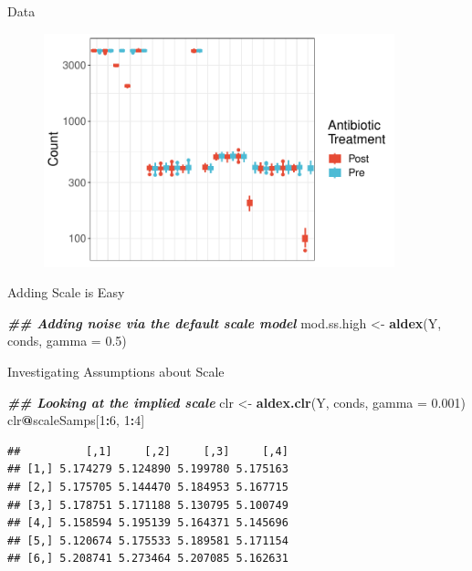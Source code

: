 \documentclass[
  ignorenonframetext,
]{beamer}
\newenvironment{Shaded}{\begin{snugshade}}{\end{snugshade}}
\newcommand{\AttributeTok}[1]{\textcolor[rgb]{0.13,0.29,0.53}{#1}}
\newcommand{\DecValTok}[1]{\textcolor[rgb]{0.00,0.00,0.81}{#1}}
\newcommand{\DocumentationTok}[1]{\textcolor[rgb]{0.56,0.35,0.01}{\textbf{\textit{#1}}}}
\newcommand{\FloatTok}[1]{\textcolor[rgb]{0.00,0.00,0.81}{#1}}
\newcommand{\FunctionTok}[1]{\textcolor[rgb]{0.13,0.29,0.53}{\textbf{#1}}}
\newcommand{\NormalTok}[1]{#1}
\newcommand{\OtherTok}[1]{\textcolor[rgb]{0.56,0.35,0.01}{#1}}
\newcommand{\SpecialCharTok}[1]{\textcolor[rgb]{0.81,0.36,0.00}{\textbf{#1}}}
\begin{document}
\begin{frame}{Data}
\protect\hypertarget{data}{}
\begin{figure}
  \centering
  \includegraphics[width=4in]{figures/sim-data.pdf}
\end{figure}
\end{frame}

\begin{frame}[fragile]{Adding Scale is Easy}
\protect\hypertarget{adding-scale-is-easy}{}
\begin{Shaded}
\begin{Highlighting}[]
\DocumentationTok{\#\# Adding noise via the default scale model}
\NormalTok{mod.ss.high }\OtherTok{\textless{}{-}} \FunctionTok{aldex}\NormalTok{(Y, conds, }\AttributeTok{gamma =} \FloatTok{0.5}\NormalTok{)}
\end{Highlighting}
\end{Shaded}
\end{frame}

\begin{frame}[fragile]{Investigating Assumptions about Scale}
\protect\hypertarget{investigating-assumptions-about-scale}{}
\begin{Shaded}
\begin{Highlighting}[]
\DocumentationTok{\#\# Looking at the implied scale}
\NormalTok{clr }\OtherTok{\textless{}{-}} \FunctionTok{aldex.clr}\NormalTok{(Y, conds, }\AttributeTok{gamma =} \FloatTok{0.001}\NormalTok{)}
\NormalTok{clr}\SpecialCharTok{@}\NormalTok{scaleSamps[}\DecValTok{1}\SpecialCharTok{:}\DecValTok{6}\NormalTok{, }\DecValTok{1}\SpecialCharTok{:}\DecValTok{4}\NormalTok{]}
\end{Highlighting}
\end{Shaded}

\begin{verbatim}
##          [,1]     [,2]     [,3]     [,4]
## [1,] 5.174279 5.124890 5.199780 5.175163
## [2,] 5.175705 5.144470 5.184953 5.167715
## [3,] 5.178751 5.171188 5.130795 5.100749
## [4,] 5.158594 5.195139 5.164371 5.145696
## [5,] 5.120674 5.175533 5.189581 5.171154
## [6,] 5.208741 5.273464 5.207085 5.162631
\end{verbatim}
\end{frame}
\end{document}
